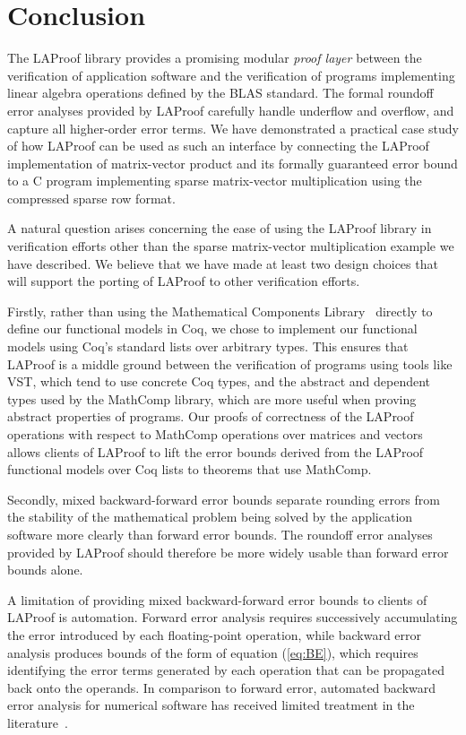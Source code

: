 \section{Conclusion}\label{sec:conclusion} The LAProof library provides a
promising modular \emph{proof layer} between the verification of application
software and the verification of programs implementing linear algebra operations
defined by the BLAS standard. The formal roundoff error analyses provided
 by LAProof carefully handle underflow and overflow, and capture all
higher-order error terms. We have demonstrated a practical case study of how
LAProof can be used as such an interface by connecting the LAProof
implementation of matrix-vector product and its formally 
guaranteed error bound to a C program implementing sparse matrix-vector
multiplication using the compressed sparse row format.

A natural question arises concerning the ease of using the LAProof library in
verification efforts other than the sparse matrix-vector multiplication example
we have described. We believe that we have made at least two design choices that
will support the porting of LAProof to other verification efforts.

Firstly, rather than using the Mathematical Components Library~\cite{mathcomp}
directly to define our functional models in Coq, we chose to implement our
functional models using Coq's standard lists over arbitrary types. This ensures
that LAProof is a middle ground between the verification of programs using tools
like VST, which tend to use concrete Coq types, and the abstract and dependent
types used by the MathComp library, which are more useful when proving abstract
properties of programs. Our proofs of correctness of the LAProof operations with
respect to MathComp operations over matrices and vectors allows clients of
LAProof to lift the error bounds derived from the LAProof functional models over
Coq lists to theorems that use MathComp.

Secondly, mixed backward-forward error bounds separate rounding errors from the
stability of the mathematical problem being solved by the application software
more clearly than forward error bounds. The roundoff error analyses provided by
LAProof should therefore be more widely usable than forward error bounds alone.

A limitation of providing mixed backward-forward error bounds to clients of
LAProof is automation. Forward error analysis requires successively accumulating
the error introduced by each floating-point operation, while backward error
analysis produces bounds of the form of equation (\ref{eq:BE}), which requires
identifying the error terms generated by each operation that can be propagated
back onto the operands. In comparison to forward error, automated backward error
analysis for numerical software has received limited treatment in the literature~\cite{BEA}.

